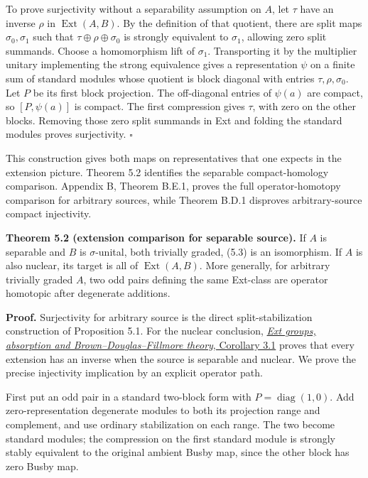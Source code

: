 \documentclass[
  11pt,
]{article}
\begin{document}
To prove surjectivity without a separability assumption on \(A\), let
\(\tau\) have an inverse \(\rho\) in \(\operatorname{Ext}(A,B)\). By the
definition of that quotient, there are split maps \(\sigma_0,\sigma_1\)
such that \(\tau\oplus\rho\oplus\sigma_0\) is strongly equivalent to
\(\sigma_1\), allowing zero split summands. Choose a homomorphism lift
of \(\sigma_1\). Transporting it by the multiplier unitary implementing
the strong equivalence gives a representation \(\psi\) on a finite sum
of standard modules whose quotient is block diagonal with entries
\(\tau,\rho,\sigma_0\). Let \(P\) be its first block projection. The
off-diagonal entries of \(\psi(a)\) are compact, so \([P,\psi(a)]\) is
compact. The first compression gives \(\tau\), with zero on the other
blocks. Removing those zero split summands in Ext and folding the
standard modules proves surjectivity. \(\square\)

This construction gives both maps on representatives that one expects in
the extension picture. Theorem 5.2 identifies the separable
compact-homology comparison. Appendix B, Theorem B.E.1, proves the full
operator-homotopy comparison for arbitrary sources, while Theorem B.D.1
disproves arbitrary-source compact injectivity.

\textbf{Theorem 5.2 (extension comparison for separable source).} If
\(A\) is separable and \(B\) is \(\sigma\)-unital, both trivially
graded, (5.3) is an isomorphism. If \(A\) is also nuclear, its target is
all of \(\operatorname{Ext}(A,B)\). More generally, for arbitrary
trivially graded \(A\), two odd pairs defining the same Ext-class are
operator homotopic after degenerate additions.

\textbf{Proof.} Surjectivity for arbitrary source is the direct
split-stabilization construction of Proposition 5.1. For the nuclear
conclusion,
\href{KT-KK-02.html\#corollary-3-1-the-extension-group-of-a-nuclear-algebra}{\emph{Ext
groups, absorption and Brown--Douglas--Fillmore theory}, Corollary 3.1}
proves that every extension has an inverse when the source is separable
and nuclear. We prove the precise injectivity implication by an explicit
operator path.

First put an odd pair in a standard two-block form with
\(P=\operatorname{diag}(1,0)\). Add zero-representation degenerate
modules to both its projection range and complement, and use ordinary
stabilization on each range. The two become standard modules; the
compression on the first standard module is strongly stably equivalent
to the original ambient Busby map, since the other block has zero Busby
map.
\end{document}
